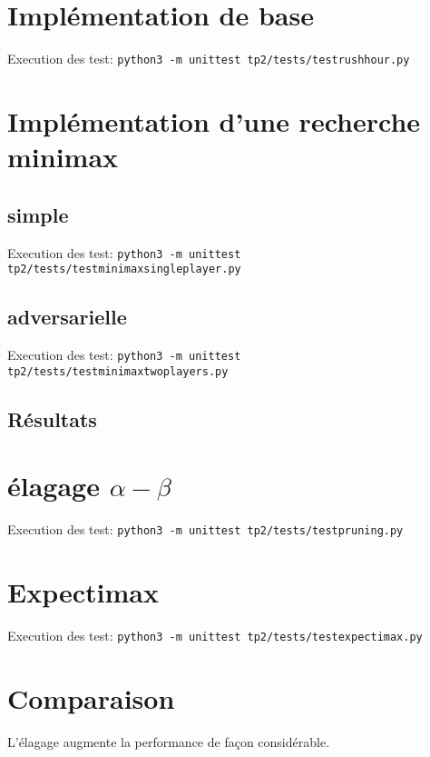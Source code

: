 \documentclass{article}
\begin{document}
    

    \section{Implémentation de base}

    Execution des test:
    \texttt{python3 -m unittest tp2/tests/testrushhour.py}

    \section{Implémentation d'une recherche minimax}

    \subsection{simple}

    Execution des test:
    \texttt{python3 -m unittest tp2/tests/testminimaxsingleplayer.py}

    \subsection{adversarielle}

    Execution des test:
    \texttt{python3 -m unittest tp2/tests/testminimaxtwoplayers.py}

    \subsection{Résultats}

    

    \section{élagage $\alpha-\beta$}

    Execution des test:
    \texttt{python3 -m unittest tp2/tests/testpruning.py}

    

    \clearpage

    \section{Expectimax}

    Execution des test:
    \texttt{python3 -m unittest tp2/tests/testexpectimax.py}

    

    \section{Comparaison}

    L'élagage augmente la performance de façon considérable.
\end{document}
